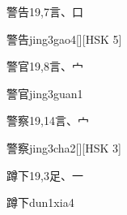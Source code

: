 \begin{entry}{警告}{19,7}{⾔、⼝}
  \begin{phonetics}{警告}{jing3gao4}[][HSK 5]
  \end{phonetics}
\end{entry}

\begin{entry}{警官}{19,8}{⾔、⼧}
  \begin{phonetics}{警官}{jing3guan1}
  \end{phonetics}
\end{entry}

\begin{entry}{警察}{19,14}{⾔、⼧}
  \begin{phonetics}{警察}{jing3cha2}[][HSK 3]
  \end{phonetics}
\end{entry}

\begin{entry}{蹲下}{19,3}{⾜、⼀}
  \begin{phonetics}{蹲下}{dun1xia4}
  \end{phonetics}
\end{entry}


